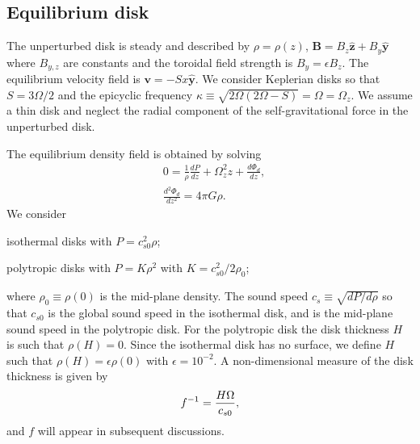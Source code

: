 
\subsection{Equilibrium disk} 
The unperturbed disk is steady and described by
$\rho=\rho(z)$, $\bm{B} = B_z\hat{\bm{z}} + B_y\hat{\bm{y}}$ where
$B_{y,z}$ are constants and the toroidal field strength is
$B_y=\epsilon B_z$. The equilibrium 
velocity field is $\bm{v} = -Sx\hat{\bm{y}}$. We consider Keplerian
disks so that $S = 3\Omega/2$ and the epicyclic frequency 
$\kappa\equiv\sqrt{2\Omega(2\Omega-S)}=\Omega=\Omega_z$. 
We assume a thin disk and neglect the radial component of the
self-gravitational force in 
the unperturbed disk.    

The equilibrium density field is obtained by solving
\begin{align}
  &0=\frac{1}{\rho}\frac{d P}{dz} + \Omega_z^2z + \frac{d\Phi_d}{dz},\label{eqm_eqns1}\\
  &\frac{d^2\Phi_d}{dz^2} = 4\pi G \rho.\label{eqm_eqns2}
\end{align}
We consider \begin{inparaenum}[(i)]
\item isothermal disks with $P=c_{s0}^2\rho$\label{iso_eos}; 
\item polytropic disks with $P=K\rho^2$ with $K=c_{s0}^2/2\rho_0$;
\end{inparaenum}
where $\rho_0\equiv\rho(0)$ is the mid-plane density.
The sound speed $c_s\equiv\sqrt{dP/d\rho}$ 
so that $c_{s0}$ is the global sound speed in the isothermal disk, and
is the mid-plane sound speed in the polytropic disk. For the polytropic
disk the disk thickness $H$ is such that $\rho(H)=0$. Since the
isothermal disk has no surface, we define $H$ such that
$\rho(H)=\epsilon\rho(0)$ with $\epsilon=10^{-2}$. A non-dimensional
measure of the disk thickness is given by 
\begin{align}
  f^{-1} = \frac{H\Omega}{c_{s0}}, 
\end{align}
and $f$ will appear in subsequent discussions. 

